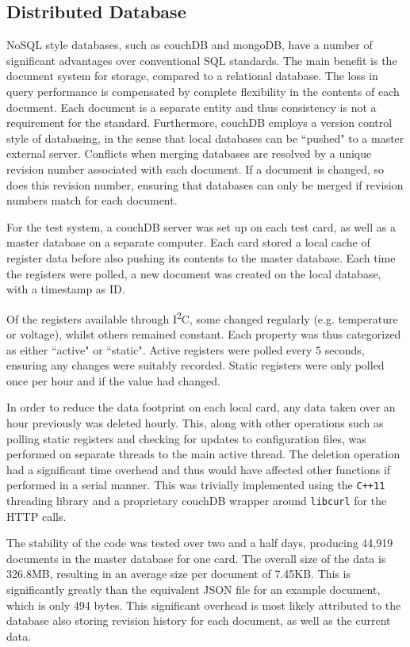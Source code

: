 \documentclass[a4paper,11pt,twocolumn]{article}
\begin{document}
	\subsection{Distributed Database}
	NoSQL style databases, such as couchDB and mongoDB, have a number of significant advantages over conventional SQL standards. The main benefit is the document system for storage, compared to a relational database. The loss in query performance is compensated by complete flexibility in the contents of each document. Each document is a separate entity and thus consistency is not a requirement for the standard. Furthermore, couchDB employs a version control style of databasing, in the sense that local databases can be ``pushed" to a master external server. Conflicts when merging databases are resolved by a unique revision number associated with each document. If a document is changed, so does this revision number, ensuring that databases can only be merged if revision numbers match for each document.

	For the test system, a couchDB server was set up on each test card, as well as a master database on a separate computer. Each card stored a local cache of register data before also pushing its contents to the master database. Each time the registers were polled, a new document was created on the local database, with a timestamp as ID.

	Of the registers available through I\textsuperscript{2}C, some changed regularly (e.g. temperature or voltage), whilst others remained constant. Each property was thus categorized as either ``active" or ``static". Active registers were polled every 5 seconds, ensuring any changes were suitably recorded. Static registers were only polled once per hour and if the value had changed.

	In order to reduce the data footprint on each local card, any data taken over an hour previously was deleted hourly. This, along with other operations such as polling static registers and checking for updates to configuration files, was performed on separate threads to the main active thread. The deletion operation had a significant time overhead and thus would have affected other functions if performed in a serial manner. This was trivially implemented using the \verb|C++11| threading library and a proprietary couchDB wrapper around \verb|libcurl| for the HTTP calls.

	The stability of the code was tested over two and a half days, producing 44,919 documents in the master database for one card. The overall size of the data is 326.8MB, resulting in an average size per document of 7.45KB. This is significantly greatly than the equivalent JSON file for an example document, which is only 494 bytes. This significant overhead is most likely attributed to the database also storing revision history for each document, as well as the current data.
\end{document}
